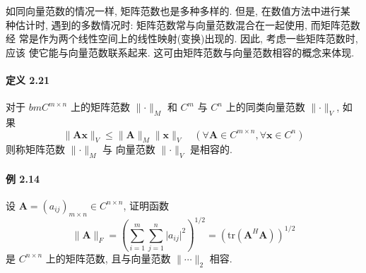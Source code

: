 \par 如同向量范数的情况一样, 矩阵范数也是多种多样的. 但是, 在数值方法中进行某
种估计时, 遇到的多数情况时: 矩阵范数常与向量范数混合在一起使用, 而矩阵范数经
常是作为两个线性空间上的线性映射(变换)出现的. 因此, 考虑一些矩阵范数时, 应该
使它能与向量范数联系起来. 这可由矩阵范数与向量范数相容的概念来体现.

\paragraph*{定义 2.21} 对于 $bm{C}^{m \times n}$ 上的矩阵范数 $\lVert \bm{\cdot} \rVert _M$ 和 $C^m$ 与 $C^n$ 上的同类向量范数 $\lVert \bm{\cdot} \rVert _V$, 如果
$$
    \lVert \bm{Ax} \rVert _V \leqslant \lVert \bm{A} \rVert _M \lVert \bm{x} \rVert _V \quad (\forall \bm{A} \in C^{m\times n}, \forall \bm{x} \in C^n)
$$
则称矩阵范数 $\lVert \bm{\cdot} \rVert _M$ 与 向量范数 $\lVert \bm{\cdot} \rVert _V$ 是相容的.

\paragraph*{例 2.14} 设 $\bm{A} = (a_{ij})_{m\times n} \in C^{n\times n}$, 证明函数
\begin{equation}
    \lVert \bm{A} \rVert _F = (\sum_{i=1}^m\sum_{j=1}^n \lvert a_{ij} \rvert^2)^{1/2} = (\mathrm{tr}(\bm{A}^H\bm{A}))^{1/2}
    \tag{2.2.5}
\end{equation}
是 $C^{n\times n}$ 上的矩阵范数, 且与向量范数 $\lVert \bm{\cdots} \rVert _2$ 相容.

